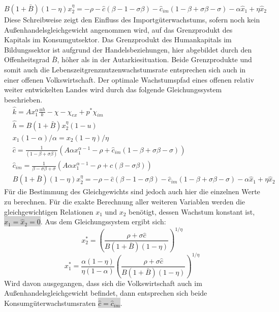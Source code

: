 %
\begin{equation}
	\boxed{
	B(1+\bar{B})(1-\eta)x_2^\eta=-\rho-\hat{c}(\beta-1-\sigma\beta)-\hat{c}_{im}(1-\beta+\sigma\beta-\sigma)-\alpha\hat{x}_1+\eta\hat{x}_2
	}
\end{equation}
%
Diese Schreibweise zeigt den Einfluss des Importgüterwachstums, sofern noch kein Außenhandelsgleichgewicht angenommen wird, auf das Grenzprodukt des Kapitals im Konsumgutsektor. Das Grenzprodukt des Humankapitals im Bildungssektor ist aufgrund der Handelsbeziehungen, hier abgebildet durch den Offenheitsgrad $\bar{B}$, höher als in der Autarkiesituation. Beide Grenzprodukte und somit auch die Lebenszeitgrenznutzenwachstumsrate entsprechen sich auch in einer offenen Volkswirtschaft.
Der optimale Wachstumspfad eines offenen relativ weiter entwickelten Landes wird durch das folgende Gleichungssystem beschrieben.
%
\begin{align}
	&\hat{k}=Ax_1^\alpha \frac{uh}{k}-\chi-\chi_{ex}+p^*\chi_{im}\\
	&\hat{h}=B(1+\bar{B})x_2^\eta(1-u)\\
	& x_1(1-\alpha)/\alpha =x_2(1-\eta)/\eta\\
	&\hat{c}=\frac{1}{(1-\beta+\sigma\beta)}\left(A\alpha x_1^{\alpha -1}-\rho+\hat{c}_{im}(1-\beta+\sigma\beta-\sigma)\right)\\
	&\hat{c}_{im}=\frac{1}{\beta-\sigma\beta+ \sigma}\left(A\alpha x_1^{\alpha -1}-\rho+\hat{c}(\beta - \sigma\beta)\right)\\
	&B(1+\bar{B})(1-\eta)x_2^\eta=-\rho-\hat{c}(\beta-1-\sigma\beta)-\hat{c}_{im}(1-\beta+\sigma\beta-\sigma)-\alpha\hat{x}_1+\eta\hat{x}_2
\end{align}
%
Für die Bestimmung des Gleichgewichts sind jedoch auch hier die einzelnen Werte zu berechnen. Für die exakte Berechnung aller weiteren Variablen werden die gleichgewichtigen Relationen $x_1$ und $x_2$ benötigt, dessen Wachstum konstant ist,  
%
\colorbox{lightgray}{$\hat{x}_1=\hat{x}_2=0$}. Aus dem Gleichungssystem ergibt sich: 
%
\begin{equation}
	x_2^*=\left(\frac{\rho+\sigma\hat{c}}{B(1+\bar{B})(1-\eta)}\right)^{1/\eta}
\end{equation}
%
\begin{equation}
	x_1^* =\frac{\alpha(1-\eta)}{\eta(1-\alpha)}\left(\frac{\rho+\sigma\hat{c}}{B(1+\bar{B})(1-\eta)}\right)^{1/\eta}
\end{equation}
%
Wird davon ausgegangen, dass sich die Volkswirtschaft auch im Außenhandelsgleichgewicht befindet, dann entsprechen sich beide Konsumgüterwachstumsraten \colorbox{lightgray}{$\hat{c}=\hat{c}_{im}$}. 

